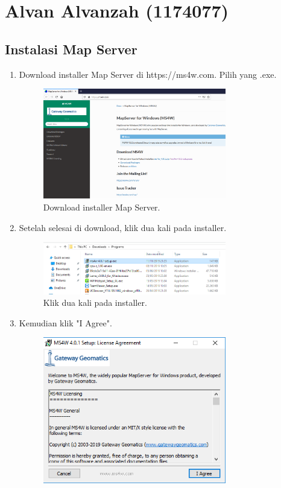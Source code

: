 \section{Alvan Alvanzah (1174077)}
\subsection{Instalasi Map Server}
\begin{enumerate}
	\item  Download installer Map Server di https://ms4w.com. Pilih yang .exe.
	\hfill\break
	\begin{figure}[H]
		\includegraphics[width=8cm]{figures/Tugas4/1174077/1.png}
		\centering
		\caption{Download installer Map Server.}
	\end{figure}
	\item  Setelah selesai di download, klik dua kali pada installer.
	\hfill\break
	\begin{figure}[H]
		\includegraphics[width=8cm]{figures/Tugas4/1174077/2.png}
		\centering
		\caption{Klik dua kali pada installer.}
	\end{figure}
	\item  Kemudian klik "I Agree".
	\hfill\break
	\begin{figure}[H]
		\includegraphics[width=8cm]{figures/Tugas4/1174077/3.png}

\end{figure}
\end{enumerate}
